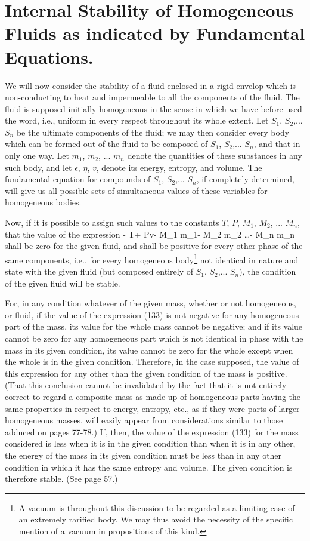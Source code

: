 \documentclass[12pt]{memoir}
\begin{document}
\section{Internal Stability of Homogeneous Fluids as indicated by Fundamental Equations.}
We will now consider the stability of a fluid enclosed in a rigid envelop which is non-conducting to heat and impermeable to all the components of the fluid. The fluid is supposed initially homogeneous in the sense in which we have before used the word, i.e., uniform in every respect throughout its whole extent. Let $S_1$, $S_2$,... $S_n$ be the ultimate components of the fluid; we may then consider every body which can be formed out of the fluid to be composed of $S_1$, $S_2$,... $S_n$, and that in only one way. Let $m_1$, $m_2$, ... $m_n$ denote the quantities of these substances in any such body, and let $\epsilon$, $\eta$, $v$, denote its energy, entropy, and volume. The fundamental equation for compounds of $S_1$, $S_2$,... $S_n$, if completely determined, will give us all possible sets of simultaneous values of these variables for homogeneous bodies.


Now, if it is possible to assign such values to the constants $T$, $P$,
$M_1$, $M_2$, ... $M_n$, that the value of the expression
\eqs \epsilon - T\eta + Pv- M_1 m_1- M_2 m_2 \dots - M_n m_n \label{133}\eqe
shall be zero for the given fluid, and shall be positive for every other phase of the same components, i.e., for every homogeneous body\footnote{A vacuum is throughout this discussion to be regarded as a limiting case of an extremely rarified body. We may thus avoid the necessity of the specific mention of a vacuum in propositions of this kind.} not identical in nature and state with the given fluid (but composed entirely of $S_1$, $S_2$,... $S_n$), the condition of the given fluid will be stable.


For, in any condition whatever of the given mass, whether or not homogeneous, or fluid, if the value of the expression (133) is not negative for any homogeneous part of the mass, its value for the whole mass cannot be negative; and if its value cannot be zero for any homogeneous part which is not identical in phase with the mass in its given condition, its value cannot be zero for the whole except when the whole is in the given condition. Therefore, in the case supposed, the value of this expression for any other than the given condition of the mass is positive. (That this conclusion cannot be invalidated by the fact that it is not entirely correct to regard a composite mass as made up of homogeneous parts having the same properties in respect to energy, entropy, etc., as if they were parts of larger homogeneous masses, will easily appear from considerations similar to those adduced on pages 77-78.) If, then, the value of the expression (133) for the mass considered is less when it is in the given condition than when it is in any other, the energy of the mass in its given condition must be less than in any other condition in which it has the same entropy and volume. The given condition is therefore stable. (See page 57.)
\end{document}
